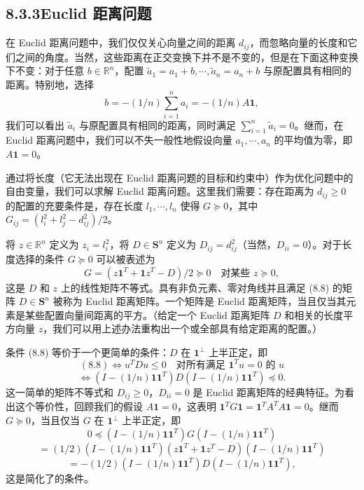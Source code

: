 \documentclass[UTF8,12pt,a4paper,fontset=fandol]{ctexart}
\begin{document}
\subsection*{8.3.3\quad Euclid 距离问题}

在 Euclid 距离问题中，我们仅仅关心向量之间的距离 $d_{ij}$，而忽略向量的长度和它们之间的角度。当然，这些距离在正交变换下并不是不变的，但是在下面这种变换下不变：对于任意 $b\in\mathbb{R}^n$，配置 $\tilde{a}_1=a_1+b,\cdots,\tilde{a}_n=a_n+b$ 与原配置具有相同的距离。特别地，选择
\[
b=-(1/n)\sum_{i=1}^n a_i=-(1/n)A\mathbf{1},
\]
我们可以看出 $\tilde{a}_i$ 与原配置具有相同的距离，同时满足 $\sum_{i=1}^n \tilde{a}_i=0$。继而，在 Euclid 距离问题中，我们可以不失一般性地假设向量 $a_1,\cdots,a_n$ 的平均值为零，即 $A\mathbf{1}=0$。

通过将长度（它无法出现在 Euclid 距离问题的目标和约束中）作为优化问题中的自由变量，我们可以求解 Euclid 距离问题。这里我们需要：存在距离为 $d_{ij}\geq 0$ 的配置的充要条件是，存在长度 $l_1,\cdots,l_n$ 使得 $G\succeq 0$，其中 $G_{ij}=(l_i^2+l_j^2-d_{ij}^2)/2$。

将 $z\in\mathbb{R}^n$ 定义为 $z_i=l_i^2$，将 $D\in\mathbf{S}^n$ 定义为 $D_{ij}=d_{ij}^2$（当然，$D_{ii}=0$）。对于长度选择的条件 $G\succeq 0$ 可以被表述为
\begin{equation}
G=(z\mathbf{1}^T+\mathbf{1}z^T-D)/2\succeq 0\quad \text{对某些 } z\succeq 0,
\tag{8.8}
\end{equation}
这是 $D$ 和 $z$ 上的线性矩阵不等式。具有非负元素、零对角线并且满足 (8.8) 的矩阵 $D\in\mathbf{S}^n$ 被称为 Euclid 距离矩阵。一个矩阵是 Euclid 距离矩阵，当且仅当其元素是某些配置向量间距离的平方。（给定一个 Euclid 距离矩阵 $D$ 和相关的长度平方向量 $z$，我们可以用上述办法重构出一个或全部具有给定距离的配置。）

条件 (8.8) 等价于一个更简单的条件：$D$ 在 $\mathbf{1}^\perp$ 上半正定，即
\[
(8.8)\Longleftrightarrow u^TDu\leq 0\quad \text{对所有满足 } \mathbf{1}^Tu=0 \text{ 的 } u
\]
\[
\Longleftrightarrow (I-(1/n)\mathbf{1}\mathbf{1}^T)D(I-(1/n)\mathbf{1}\mathbf{1}^T)\preceq 0.
\]
这一简单的矩阵不等式和 $D_{ij}\geq 0$，$D_{ii}=0$ 是 Euclid 距离矩阵的经典特征。为看出这个等价性，回顾我们的假设 $A\mathbf{1}=0$，这表明 $\mathbf{1}^TG\mathbf{1}=\mathbf{1}^TA^TA\mathbf{1}=0$。继而 $G\succeq 0$，当且仅当 $G$ 在 $\mathbf{1}^\perp$ 上半正定，即
\[
0\preceq (I-(1/n)\mathbf{1}\mathbf{1}^T)G(I-(1/n)\mathbf{1}\mathbf{1}^T)
\]
\[
=(1/2)(I-(1/n)\mathbf{1}\mathbf{1}^T)(z\mathbf{1}^T+\mathbf{1}z^T-D)(I-(1/n)\mathbf{1}\mathbf{1}^T)
\]
\[
=-(1/2)(I-(1/n)\mathbf{1}\mathbf{1}^T)D(I-(1/n)\mathbf{1}\mathbf{1}^T),
\]
这是简化了的条件。
\end{document}
